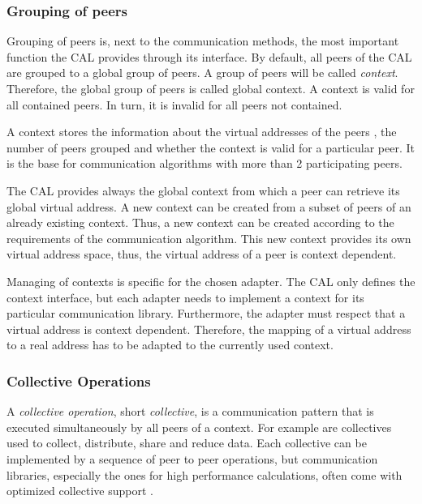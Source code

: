 \subsubsection*{Grouping of peers}
\label{sec:cal_context}
Grouping of peers is, next to the communication methods, the most
important function the CAL provides through its interface.  By
default, all peers of the CAL are grouped to a global group of peers.
A group of peers will be called \textit{context}. Therefore, the
global group of peers is called global context. A context is valid for
all contained peers. In turn, it is invalid for all peers not
contained.

A context stores the information about the virtual addresses of the peers , the
number of peers grouped and whether the context is valid for a particular
peer. It is the base for communication algorithms with more than 2
participating peers.

The CAL provides always the global context from which a peer can
retrieve its global virtual address. A new context can be created from
a subset of peers of an already existing context. Thus, a new context
can be created according to the requirements of the communication
algorithm. This new context provides its own virtual address space,
thus, the virtual address of a peer is context dependent.

Managing of contexts is specific for the chosen adapter. The CAL only
defines the context interface, but each adapter needs to implement a
context for its particular communication library. Furthermore, the
adapter must respect that a virtual address is context
dependent. Therefore, the mapping of a virtual address to a real
address has to be adapted to the currently used context.

\subsubsection*{Collective Operations}
\label{sec:cal_collective}
A \textit{collective operation}, short \textit{collective}, is a
communication pattern that is executed simultaneously by all peers of
a context. For example are collectives used to collect, distribute,
share and reduce data.  Each collective can be implemented by a
sequence of peer to peer operations, but communication libraries,
especially the ones for high performance calculations, often come with
optimized collective support \cite{ref:mpi}.


